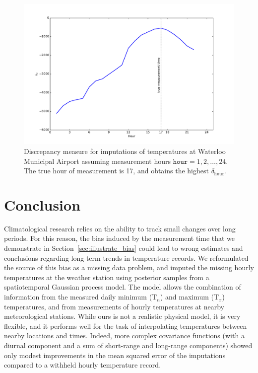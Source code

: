 \documentclass[letter]{article}
\makeatletter
\def\maxwidth{\ifdim\Gin@nat@width>\linewidth\linewidth
\else\Gin@nat@width\fi}
\let\Oldincludegraphics\includegraphics
\renewcommand{\includegraphics}[1]{\Oldincludegraphics[width=0.98\maxwidth]{#1}}
\newcommand{\T}{\mathrm{T}}
\newcommand{\Tn}{\T_{n}}
\newcommand{\Tx}{\T_{x}}
\newcommand{\hour}{\mathtt{hour}}
\makeatother
\begin{document}
        \begin{figure}
\centering
\includegraphics{../figures/hr_inference.pdf}
\caption{\label{fig:hr_inference} Discrepancy measure for imputations of temperatures at Waterloo Municipal Airport assuming measurement hours \(\hour=1,2,\ldots,24\). The true hour of measurement is 17, and obtains the highest \(\delta_\hour\).}
\end{figure}
    


        \section{Conclusion}\label{conclusion}
    


        Climatological research relies on the ability to track small changes over long periods.
For this reason, the bias induced by the measurement time
that we demonstrate in Section~\ref{sec:illustrate_bias}
could lead to wrong estimates and conclusions regarding long-term trends in temperature records.
We reformulated the source of this bias as a missing data problem, and imputed the missing hourly temperatures at the weather station using posterior samples from a spatiotemporal Gaussian process model.
The model allows the combination of information from the measured daily minimum (\(\Tn\)) and maximum (\(\Tx\)) temperatures, and from measurements of hourly temperatures at nearby meteorological stations.
While ours is not a realistic physical model, it is very flexible, and it performs well for the task of interpolating temperatures between nearby locations and times.
Indeed, more complex covariance functions (with a diurnal component and a sum of short-range and long-range components) showed only modest improvements in the mean squared error of the imputations compared to a withheld hourly temperature record.
    
\end{document}
